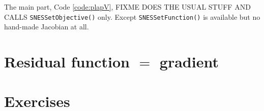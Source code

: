 The main part, Code \ref{code:plapV}, FIXME DOES THE USUAL STUFF AND CALLS \texttt{SNESSetObjective()} only.  Except \texttt{SNESSetFunction()} is available but no hand-made Jacobian at all.

\clearpage
{}


\section{Residual function $=$ gradient}



\section{Exercises}


